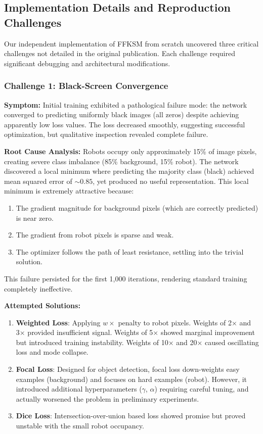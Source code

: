 \documentclass[12pt,a4paper,oneside]{report}
\begin{document}
\subsection{Implementation Details and Reproduction Challenges}
\label{subsec:implementation_details_and_reproduction_challenges}

Our independent implementation of FFKSM from scratch uncovered three critical challenges not detailed in the original publication. Each challenge required significant debugging and architectural modifications.

\subsubsection{Challenge 1: Black-Screen Convergence}
\label{subsubsec:challenge_1_black_screen_convergence}

\textbf{Symptom:} Initial training exhibited a pathological failure mode: the network converged to predicting uniformly black images (all zeros) despite achieving apparently low loss values. The loss decreased smoothly, suggesting successful optimization, but qualitative inspection revealed complete failure.

\textbf{Root Cause Analysis:} Robots occupy only approximately 15\% of image pixels, creating severe class imbalance (85\% background, 15\% robot). The network discovered a local minimum where predicting the majority class (black) achieved mean squared error of $\sim 0.85$, yet produced no useful representation. This local minimum is extremely attractive because:

\begin{enumerate}
    \item The gradient magnitude for background pixels (which are correctly predicted) is near zero.
    \item The gradient from robot pixels is sparse and weak.
    \item The optimizer follows the path of least resistance, settling into the trivial solution.
\end{enumerate}

This failure persisted for the first 1,000 iterations, rendering standard training completely ineffective.

\textbf{Attempted Solutions:}

\begin{enumerate}
    \item \textbf{Weighted Loss}: Applying $w \times$ penalty to robot pixels. Weights of 2× and 3× provided insufficient signal. Weights of 5× showed marginal improvement but introduced training instability. Weights of 10× and 20× caused oscillating loss and mode collapse.
    \item \textbf{Focal Loss}: Designed for object detection, focal loss down-weights easy examples (background) and focuses on hard examples (robot). However, it introduced additional hyperparameters ($\gamma$, $\alpha$) requiring careful tuning, and actually worsened the problem in preliminary experiments.
    \item \textbf{Dice Loss}: Intersection-over-union based loss showed promise but proved unstable with the small robot occupancy.
\end{enumerate}
\end{document}
